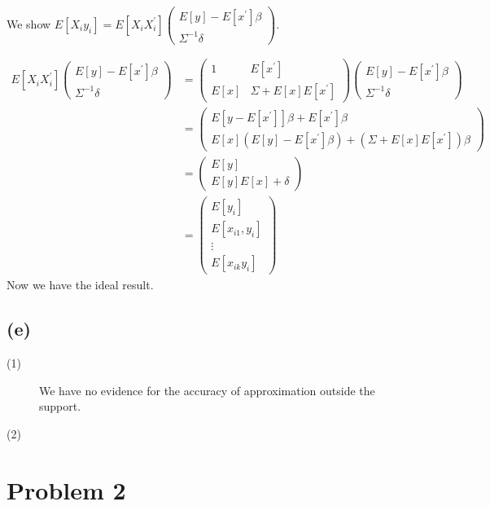 \documentclass{article}
\begin{document}
We show $E\left[ X_i y_i \right] = E\left[ X_i X_i^{'} \right] \left(\begin{array}{cc} E[y] - E[x^{'}]\beta\\ \Sigma^{-1}\delta \end{array}\right)$.

\begin{align*}
	E\left[ X_i X_i^{'} \right] \left(\begin{array}{cc} E[y] - E[x^{'}]\beta\\ \Sigma^{-1}\delta \end{array}\right) &= \left(\begin{array}{cc} 1 & E[x^{'}] \\ E[x] & \Sigma + E[x]E[x^{'}] \end{array}\right)  \left(\begin{array}{cc} E[y] - E[x^{'}]\beta \\ \Sigma^{-1}\delta \end{array}\right)\\[8pt]
	&=  \left(\begin{array}{cc} E[y - E[x^{'}]]\beta + E[x^{'}]\beta \\[6pt] E[x](E[y] - E[x^{'}]\beta) + (\Sigma + E[x]E[x^{'}])\beta \end{array}\right)\\[8pt]
	&=  \left(\begin{array}{cc} E[y] \\ E[y]E[x] + \delta \end{array}\right)\\[8pt]
	&=  \left(\begin{array}{cc} E[y_i] \\ E[x_{i1}, y_i] \\ \vdots \\ E[x_{ik}y_i] \end{array}\right)
\end{align*}
Now we have the ideal result.

\subsection{(e)}
\begin{description}
	\item[(1)] We have no evidence for the accuracy of approximation outside the support.
	\item[(2)] 
\end{description}

\section{Problem 2}
\end{document}

